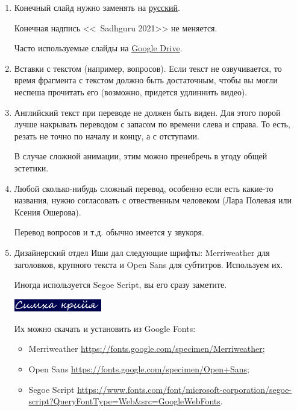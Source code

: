 \documentclass[
a4paper, %
12pt, %
article,
onecolumn, %
openany, %
]{memoir}
\begin{document}
\begin{enumerate}
\item Конечный слайд нужно заменять на \href{https://drive.google.com/file/d/11NbSgvq8LbxDcy-a2WY5OJTKUZKcZx88/view?usp=sharing}{русский}. 

	Конечная надпись <<\textcopyright\ Sadhguru 2021>> не меняется.

 Часто используемые слайды на 
\href{https://drive.google.com/drive/folders/1O54z3DtKpl90ut0Aa8wYkEEP37e00zPY?usp=sharing}{Google Drive}.

\item Вставки с текстом (например, вопросов). Если текст не озвучивается, то время фрагмента с текстом должно быть достаточным, чтобы вы могли неспеша прочитать его (возможно, придется удлиннить видео).

\item Английский текст при переводе не должен быть виден. Для этого порой лучше
    накрывать переводом с запасом по времени слева и справа. То есть, резать
    не точно по началу и концу, а с отступами.

    В случае сложной анимации, этим можно пренебречь в угоду общей эстетики.

\item Любой сколько-нибудь сложный перевод, особенно если есть какие-то названия, нужно согласовать с отвественным человеком (Лара Полевая или Ксения Ошерова).

	Перевод вопросов и т.д. обычно имеется у звукоря.

\item Дизайнерский отдел Иши дал следующие шрифты: Merriweather для заголовков, крупного текста и Open Sans для субтитров. Используем их.

    Иногда используется Segoe Script, вы его сразу заметите.

 \includegraphics[width=0.3\textwidth]{segoeScript}

    Их можно скачать и установить из Google Fonts:
    \begin{itemize}
        \item  Merriweather \href{https://fonts.google.com/specimen/Merriweather}{\small https://fonts.google.com/specimen/Merriweather};
        \item Open Sans \href{https://fonts.google.com/specimen/Open+Sans}{\small https://fonts.google.com/specimen/Open+Sans};
    \item Segoe Script \href{https://www.fonts.com/font/microsoft-corporation/segoe-script?QueryFontType=Web&src=GoogleWebFonts}{\small https://www.fonts.com/font/microsoft-corporation/segoe-script?QueryFontType=Web\&src=GoogleWebFonts}.
      \end{itemize}


\end{enumerate}
\end{document}
